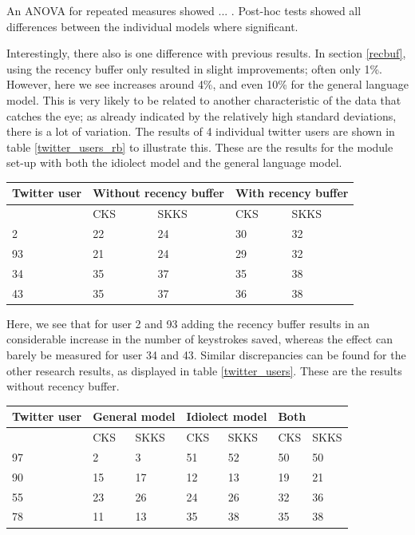 \documentclass[12pt]{article}
\let\originaltable\table
\let\endoriginaltable\endtable
\renewenvironment{table}[1][ht]{%
  \originaltable[#1]
  \centering}%
  {\endoriginaltable}
\begin{document}
An ANOVA for repeated measures showed ... . Post-hoc tests showed all differences between the individual models where significant. %

Interestingly, there also is one difference with previous results. In section \ref{recbuf}, using the recency buffer only resulted in slight improvements; often only 1\%. However, here we see increases around 4\%, and even 10\% for the general language model. This is very likely to be related to another characteristic of the data that catches the eye; as already indicated by the relatively high standard deviations, there is a lot of variation. The results of 4 individual twitter users are shown in table \ref{twitter_users_rb} to illustrate this. These are the results for the module set-up with both the idiolect model and the general language model.

\begin{table}[H] 
\centering
\begin{tabular}{l|llll} 
Twitter user&\multicolumn{2}{l}{Without recency buffer}&\multicolumn{2}{l}{With recency buffer}\\
\hline
&CKS&SKKS&CKS&SKKS\\
2&22&24&30&32\\
93&21&24&29&32\\
34&35&37&35&38\\
43&35&37&36&38\\
\end{tabular} 
\caption{Percentage of keystrokes saved for 4 individual Twitter users, with and without the recency buffer} \label{twitter_users_rb}
\end{table}

Here, we see that for user 2 and 93 adding the recency buffer results in an considerable increase in the number of keystrokes saved, whereas the effect can barely be measured for user 34 and 43. Similar discrepancies can be found for the other research results, as displayed in table \ref{twitter_users}. These are the results without recency buffer.

\begin{table}[H] 
\centering
\begin{tabular}{l|llllll} 
Twitter user&\multicolumn{2}{l}{General model}&\multicolumn{2}{l}{Idiolect model}&\multicolumn{2}{l}{Both}\\
\hline
&CKS&SKKS&CKS&SKKS&CKS&SKKS\\
97&2&3&51&52&50&50\\
90&15&17&12&13&19&21\\
55&23&26&24&26&32&36\\
78&11&13&35&38&35&38\\
\end{tabular} 
\caption{Percentage of keystrokes saved for 4 individual Twitter users, for the idiolect and the general model} \label{twitter_users}
\end{table}
\end{document}
